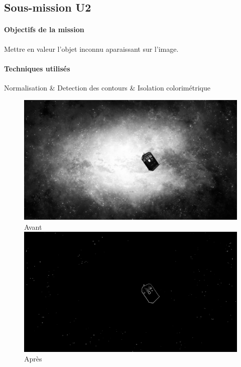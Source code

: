 \subsection{Sous-mission U2}

	\begin{vwcol}[widths={0.65,0.2}, rule=0pt]
	\begin{minipage}{0.7\textwidth}
	\paragraph{Objectifs de la mission}

	Mettre en valeur l'objet inconnu aparaissant sur l'image.
	\end{minipage}

	\begin{minipage}{0.3\textwidth}
	\begin{flushright}
	\paragraph{Techniques utilisés}

	Normalisation \& Detection des contours \& Isolation colorimétrique
	\end{flushright}
	\end{minipage}

	\end{vwcol} 

	\begin{figure}[h]
	\centering
		\begin{multicols}{2}
		\includegraphics[scale=0.27]{images/U2_surface.png}
		Avant
		\includegraphics[scale=0.27]{images/MissionU2.png}
		Après
		\end{multicols}
	\end{figure}
	\vspace{-0.9cm}

